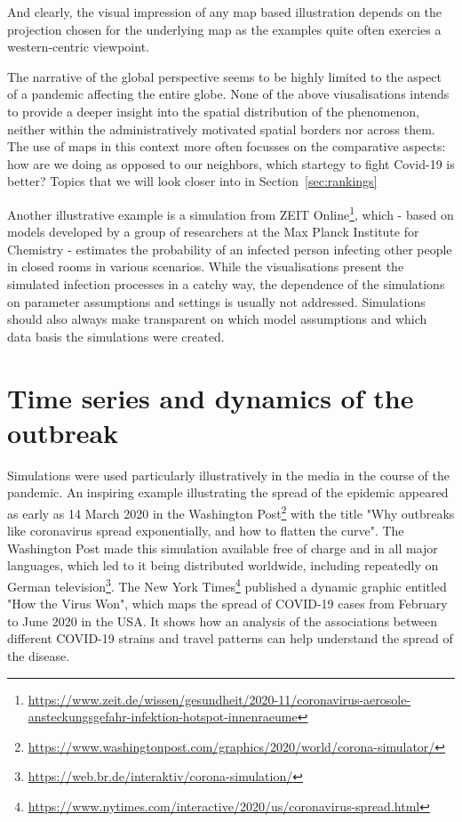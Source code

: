 \documentclass[article]{jdssv}\usepackage[]{graphicx}\usepackage[]{color}
\begin{document}
And clearly, the visual impression of any map based illustration depends on the projection chosen for the underlying map as the examples quite often exercies a western-centric viewpoint.

The narrative of the global perspective seems to be highly limited to the aspect of a pandemic affecting the entire globe. None of the above viusalisations intends to provide a deeper insight into the spatial distribution of the phenomenon, neither within the administratively motivated spatial borders nor across them. The use of maps in this context more often focusses on the comparative aspects: how are we doing as opposed to our neighbors, which startegy to fight Covid-19 is better? Topics that we will look closer into in Section~\ref{sec:rankings}

Another illustrative example is a simulation from ZEIT Online\footnote{\url{https://www.zeit.de/wissen/gesundheit/2020-11/coronavirus-aerosole-ansteckungsgefahr-infektion-hotspot-innenraeume}}, which - based on models developed by a group of researchers at the Max Planck Institute for Chemistry - estimates the probability of an infected person infecting other people in closed rooms in various scenarios. While the visualisations present the simulated infection processes in a catchy way, the dependence of the simulations on parameter assumptions and settings is usually not addressed. Simulations should also always make transparent on which model assumptions and which data basis the simulations were created.


\section{Time series and dynamics of the outbreak}




Simulations were used particularly illustratively in the media in the course of the pandemic. An inspiring example illustrating the spread of the epidemic appeared as early as 14 March 2020 in the Washington Post\footnote{\url{https://www.washingtonpost.com/graphics/2020/world/corona-simulator/}} with the title "Why outbreaks like coronavirus spread exponentially, and how to flatten the curve". The Washington Post made this simulation available free of charge and in all major languages, which led to it being distributed worldwide, including repeatedly on German television\footnote{\url{https://web.br.de/interaktiv/corona-simulation/}}. The New York Times\footnote{\url{https://www.nytimes.com/interactive/2020/us/coronavirus-spread.html}} published a dynamic graphic entitled "How the Virus Won", which maps the spread of COVID-19 cases from February to June 2020 in the USA. It shows how an analysis of the associations between different COVID-19 strains and travel patterns can help understand the spread of the disease.
\end{document}
